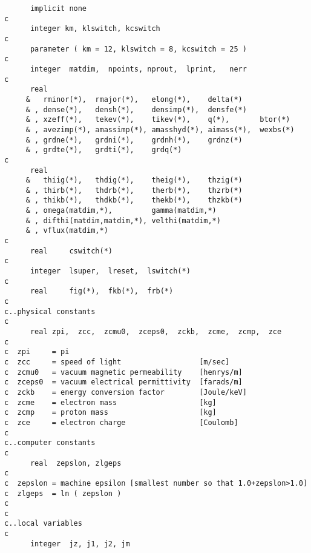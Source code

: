 \begin{verbatim}
      implicit none
c
      integer km, klswitch, kcswitch
c
      parameter ( km = 12, klswitch = 8, kcswitch = 25 )
c
      integer  matdim,  npoints, nprout,  lprint,   nerr
c
      real
     &   rminor(*),  rmajor(*),   elong(*),    delta(*)
     & , dense(*),   densh(*),    densimp(*),  densfe(*)
     & , xzeff(*),   tekev(*),    tikev(*),    q(*),       btor(*)
     & , avezimp(*), amassimp(*), amasshyd(*), aimass(*),  wexbs(*)
     & , grdne(*),   grdni(*),    grdnh(*),    grdnz(*)
     & , grdte(*),   grdti(*),    grdq(*)
c
      real  
     &   thiig(*),   thdig(*),    theig(*),    thzig(*)
     & , thirb(*),   thdrb(*),    therb(*),    thzrb(*)
     & , thikb(*),   thdkb(*),    thekb(*),    thzkb(*)
     & , omega(matdim,*),         gamma(matdim,*)
     & , difthi(matdim,matdim,*), velthi(matdim,*)
     & , vflux(matdim,*)
c
      real     cswitch(*)
c
      integer  lsuper,  lreset,  lswitch(*)
c
      real     fig(*),  fkb(*),  frb(*)
c
c..physical constants
c
      real zpi,  zcc,  zcmu0,  zceps0,  zckb,  zcme,  zcmp,  zce
c
c  zpi     = pi
c  zcc     = speed of light                  [m/sec]
c  zcmu0   = vacuum magnetic permeability    [henrys/m]
c  zceps0  = vacuum electrical permittivity  [farads/m]
c  zckb    = energy conversion factor        [Joule/keV]
c  zcme    = electron mass                   [kg]
c  zcmp    = proton mass                     [kg]
c  zce     = electron charge                 [Coulomb]
c
c..computer constants
c
      real  zepslon, zlgeps
c
c  zepslon = machine epsilon [smallest number so that 1.0+zepslon>1.0]
c  zlgeps  = ln ( zepslon )
c
c
c..local variables
c
      integer  jz, j1, j2, jm


\end{verbatim}
